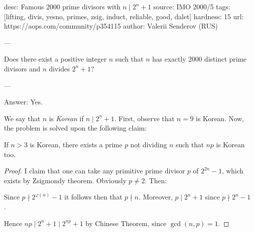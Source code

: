 desc:  Famous 2000 prime divisors with $n \mid 2^n+1$
source:  IMO 2000/5
tags:  [lifting, divis, yesno, primes, zsig, induct, reliable, good, dalet]
hardness: 15
url: https://aops.com/community/p354115
author: Valerii Senderov (RUS)

---

Does there exist a positive integer $n$
such that $n$ has exactly 2000 distinct prime divisors
and $n$ divides $2^n + 1$?

---

Answer: Yes.

We say that $n$ is \emph{Korean} if $n \mid 2^n+1$.
First, observe that $n=9$ is Korean.
Now, the problem is solved upon the following claim:
\begin{claim*}
  If $n > 3$ is Korean,
  there exists a prime $p$ not dividing $n$
  such that $np$ is Korean too.
\end{claim*}
\begin{proof}
  I claim that one can take any primitive prime divisor $p$ of $2^{2n}-1$,
  which exists by Zsigmondy theorem.
  Obviously $p \neq 2$.
  Then:
  \begin{itemize}
    \ii Since $p \nmid 2^{\varphi(n)}-1$ it follows then that $p \nmid n$.
    \ii Moreover, $p \mid 2^n+1$ since $p \nmid 2^n-1$.
  \end{itemize}
  Hence $np \mid 2^n+1 \mid 2^{np} + 1$ by Chinese Theorem,
  since $\gcd(n,p) = 1$.
\end{proof}
